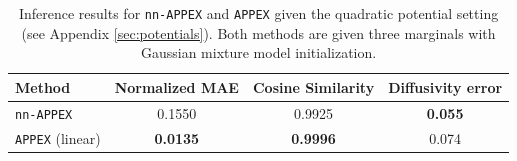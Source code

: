 \documentclass[twoside]{article}
\newcommand{\nappex}{\texttt{nn-APPEX}}
\newcommand{\appex}{\texttt{APPEX}}
\begin{document}
\begin{table}[h!]
\caption{Inference results for \nappex{} and \appex{} given the quadratic potential setting (see Appendix \ref{sec:potentials}). Both methods are given three marginals with Gaussian mixture model initialization.}
\label{tab:APPEX_vs_nnAPPEX}
    \centering
    \begin{tabular}{lccc}
        \toprule
        \textbf{Method} & \textbf{Normalized MAE} & \textbf{Cosine Similarity} & \textbf{Diffusivity error} \\
        \midrule
        \nappex{}       & 0.1550          & 0.9925          & \textbf{0.055} \\
        \appex{} (linear) & \textbf{0.0135} & \textbf{0.9996} & 0.074 \\
        \bottomrule
    \end{tabular}
\end{table}







\end{document}
